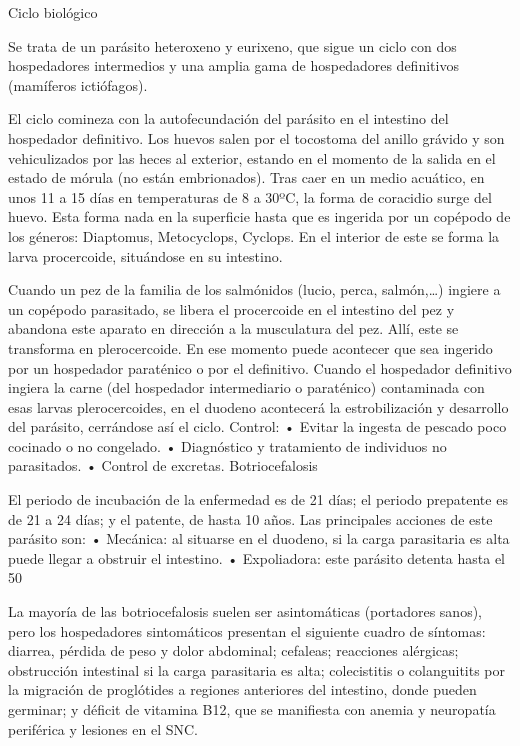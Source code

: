 Ciclo biológico

Se trata de un parásito heteroxeno y eurixeno, que sigue un ciclo con dos hospedadores intermedios y una amplia gama de hospedadores definitivos (mamíferos ictiófagos).

El ciclo comineza con la autofecundación del parásito en el intestino del hospedador definitivo. Los huevos salen por el tocostoma del anillo grávido y son vehiculizados por las heces al exterior, estando en el momento de la salida en el estado de mórula (no están embrionados). Tras caer en un medio acuático, en unos 11 a 15 días en temperaturas de 8 a 30ºC, la forma de coracidio surge del huevo. Esta forma nada en la superficie hasta que es ingerida por un copépodo de los géneros: Diaptomus, Metocyclops, Cyclops. En el interior de este se forma la larva procercoide, situándose en su intestino.

Cuando un pez de la familia de los salmónidos (lucio, perca, salmón,…) ingiere a un copépodo parasitado, se libera el procercoide en el intestino del pez y abandona este aparato en dirección a la musculatura del pez. Allí, este se transforma en plerocercoide. En ese momento puede acontecer que sea ingerido por un hospedador paraténico o por el definitivo. Cuando el hospedador definitivo ingiera la carne (del hospedador intermediario o paraténico) contaminada con esas larvas plerocercoides, en el duodeno acontecerá la estrobilización y desarrollo del parásito, cerrándose así el ciclo.
Control:
• Evitar la ingesta de pescado poco cocinado o no congelado.
• Diagnóstico y tratamiento de individuos no parasitados.
• Control de excretas.
Botriocefalosis

El periodo de incubación de la enfermedad es de 21 días; el periodo prepatente es de 21 a 24 días; y el patente, de hasta 10 años. Las principales acciones de este parásito son:
• Mecánica: al situarse en el duodeno, si la carga parasitaria es alta puede llegar a obstruir el intestino.
• Expoliadora: este parásito detenta hasta el 50%

La mayoría de las botriocefalosis suelen ser asintomáticas (portadores sanos), pero los hospedadores sintomáticos presentan el siguiente cuadro de síntomas: diarrea, pérdida de peso y dolor abdominal; cefaleas; reacciones alérgicas; obstrucción intestinal si la carga parasitaria es alta; colecistitis o colanguitits por la migración de proglótides a regiones anteriores del intestino, donde pueden germinar; y déficit de vitamina B12, que se manifiesta con anemia y neuropatía periférica y lesiones en el SNC.

